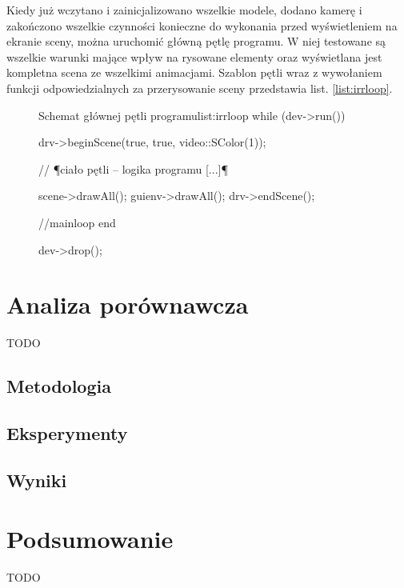 \documentclass[11pt]{mwrep}
\begin{document}
Kiedy już wczytano i zainicjalizowano wszelkie modele, dodano kamerę i zakończono wszelkie czynności konieczne do wykonania przed wyświetleniem na ekranie sceny, można uruchomić główną pętlę programu. W niej testowane są wszelkie warunki mające wpływ na rysowane elementy oraz wyświetlana jest kompletna scena ze wszelkimi animacjami. Szablon pętli wraz z wywołaniem funkcji odpowiedzialnych za przerysowanie sceny przedstawia list. \ref{list:irrloop}.

\begin{figure}
\begin{listing}{Schemat głównej pętli programu}{list:irrloop}
	while (dev->run()) {
		drv->beginScene(true, true, video::SColor(1));

		// ¶ciało pętli -- logika programu [...]¶

		scene->drawAll();
		guienv->drawAll();
		drv->endScene();
	} //mainloop end

	dev->drop();

\end{listing}
\end{figure}

\chapter{Analiza porównawcza}
TODO
  \section{Metodologia}
  \section{Eksperymenty}
  \section{Wyniki}

\chapter{Podsumowanie}
TODO
\lstlistoflistings
\end{document}
